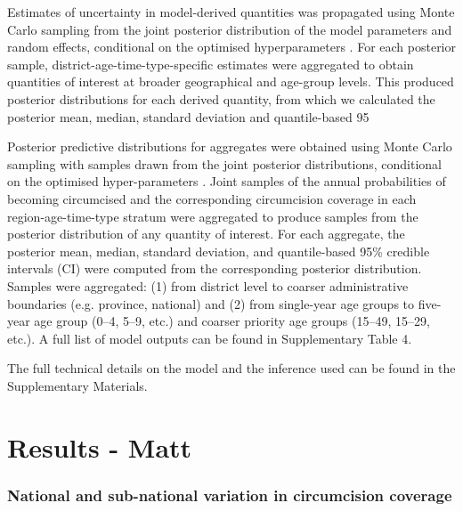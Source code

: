 \documentclass{article}
\begin{document}
Estimates of uncertainty in model-derived quantities was propagated using Monte Carlo sampling from the joint posterior distribution of the model parameters and random effects, conditional on the optimised hyperparameters \cite{eaton2021naomi}. For each posterior sample, district-age-time-type-specific estimates were aggregated to obtain quantities of interest at broader geographical and age-group levels. This produced posterior distributions for each derived quantity, from which we calculated the posterior mean, median, standard deviation and quantile-based 95%


 Posterior predictive distributions for aggregates were obtained using Monte Carlo sampling with samples drawn from the joint posterior distributions, conditional on the optimised hyper-parameters \cite{eaton2021naomi}. Joint samples of the annual probabilities of becoming circumcised and the corresponding circumcision coverage in each region-age-time-type stratum were aggregated to produce samples from the posterior distribution of any quantity of interest. For each aggregate, the posterior mean, median, standard deviation, and quantile-based 95\% credible intervals (CI) were computed from the corresponding posterior distribution. Samples were aggregated: (1) from district level to coarser administrative boundaries (e.g. province, national) and (2) from single-year age groups to five-year age group (0--4, 5--9, etc.) and coarser priority age groups (15--49, 15--29, etc.). A full list of model outputs can be found in Supplementary Table 4. 

The full technical details on the model and the inference used can be found in the Supplementary Materials. 


\section*{Results - Matt}


\subsubsection*{National and sub-national variation in circumcision coverage}
\end{document}
